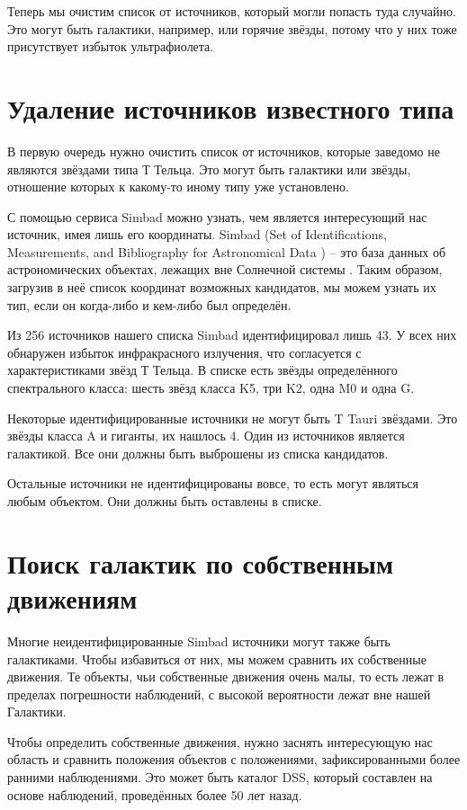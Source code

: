 Теперь мы очистим список от источников, который могли попасть туда случайно. Это могут быть галактики, например, или горячие звёзды, потому что у них тоже присутствует избыток ультрафиолета.

\section{Удаление источников известного типа}
В первую очередь нужно очистить список от источников, которые заведомо не являются звёздами типа Т Тельца. Это могут быть галактики или звёзды, отношение которых к какому-то иному типу уже установлено.

С помощью сервиса Simbad можно узнать, чем является интересующий нас источник, имея лишь его координаты. Simbad (Set of Identifications, Measurements, and Bibliography for Astronomical Data ) -- это база данных об астрономических объектах, лежащих вне Солнечной системы \cite{wenger2000simbad}. Таким образом, загрузив в неё список координат возможных кандидатов, мы можем узнать их тип, если он когда-либо и кем-либо был определён.

Из 256 источников нашего списка Simbad идентифицировал лишь 43. У всех них обнаружен избыток инфракрасного излучения, что согласуется с характеристиками звёзд Т Тельца. В списке есть звёзды определённого спектрального класса: шесть звёзд класса K5, три K2, одна M0 и одна G.

Некоторые идентифицированные источники не могут быть T Tauri звёздами. Это звёзды класса A и гиганты, их нашлось 4. Один из источников является галактикой. Все они должны быть выброшены из списка кандидатов.

Остальные источники не идентифицированы вовсе, то есть могут являться любым объектом. Они должны быть оставлены в списке.

\section{Поиск галактик по собственным движениям}
Многие неидентифицированные Simbad источники могут также быть галактиками. Чтобы избавиться от них, мы можем сравнить их собственные движения. Те объекты, чьи собственные движения очень малы, то есть лежат в пределах погрешности наблюдений, с высокой вероятности лежат вне нашей Галактики.

Чтобы определить собственные движения, нужно заснять интересующую нас область и сравнить положения объектов с положениями, зафиксированными более ранними наблюдениями. Это может быть каталог DSS, который составлен на основе наблюдений, проведённых более 50 лет назад.

